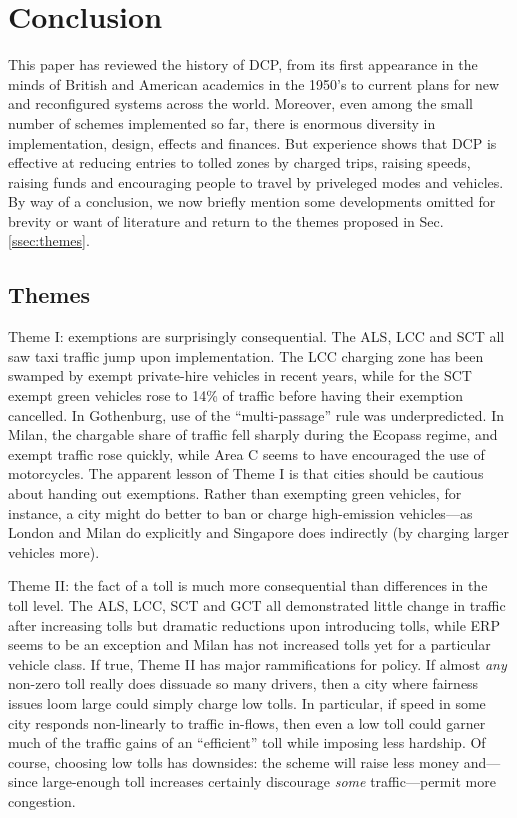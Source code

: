 \section{Conclusion}\label{sec:conclusion}

This paper has reviewed the history of DCP, from its first appearance in the minds of British and American academics in the 1950's to current plans for new and reconfigured systems across the world. Moreover, even among the small number of schemes implemented so far, there is enormous diversity in implementation, design, effects and finances. But experience shows that DCP is effective at reducing entries to tolled zones by charged  trips, raising speeds, raising funds and encouraging people to travel by priveleged modes and vehicles. By way of a conclusion, we now briefly mention some developments omitted for brevity or want of literature and return to the themes proposed in Sec. \ref{ssec:themes}.

\subsection{Themes}

Theme I: exemptions are surprisingly consequential. The ALS, LCC and SCT all saw taxi traffic jump upon implementation. The LCC charging zone has been swamped by exempt private-hire vehicles in recent years, while for the SCT exempt green vehicles rose to 14\% of traffic before having their exemption cancelled. In Gothenburg, use of the ``multi-passage'' rule was underpredicted. In Milan, the chargable share of traffic fell sharply during the Ecopass regime, and exempt traffic rose quickly, while Area C seems to have encouraged the use of motorcycles. The apparent lesson of Theme I is that cities should be cautious about handing out exemptions. Rather than exempting green vehicles, for instance, a city might do better to ban or charge high-emission vehicles---as London and Milan do explicitly and Singapore does indirectly (by charging larger vehicles more).

Theme II: the fact of a toll is much more consequential than differences in the toll level. The ALS, LCC, SCT and GCT all demonstrated little change in traffic after increasing tolls but dramatic reductions upon introducing tolls, while ERP seems to be an exception and Milan has not increased tolls yet for a particular vehicle class. If true, Theme II has major rammifications for policy. If almost \emph{any} non-zero toll really does dissuade so many drivers, then a city where fairness issues loom large could simply charge low tolls. In particular, if speed in some city responds non-linearly to traffic in-flows, then even a low toll could garner much of the traffic gains of an ``efficient'' toll while imposing less hardship. Of course, choosing low tolls has downsides: the scheme will raise less money and---since large-enough toll increases certainly discourage \emph{some} traffic---permit more congestion.
